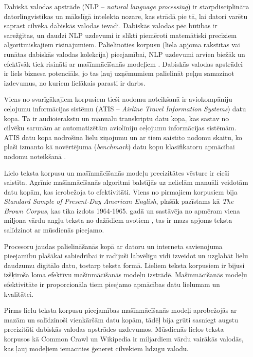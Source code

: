 Dabiskā valodas apstrāde (NLP -- \textit{natural language processing}) ir starpdisciplināra datorlingvistikas un mākslīgā intelekta nozare, kas strādā pie tā, lai datori varētu saprast cilvēka dabiskās valodas ievadi. Dabiskās valodas pēc būtības ir sarežģītas, un daudzi NLP uzdevumi ir slikti piemēroti matemātiski precīziem algoritmiskajiem risinājumiem. Palielinoties korpusu (liela apjoma rakstītas vai runātas dabiskās valodas kolekcija) pieejamībai, NLP uzdevumi arvien biežāk un efektīvāk tiek risināti ar mašīnmācīšanās modeļiem \cite{nlp2018}. Dabiskās valodas apstrādei ir liels biznesa potenciāls, jo tas ļauj uzņēmumiem palielināt peļņu samazinot izdevumus, no kuriem lielākais parasti ir darbs. %


Viens no svarīgākajiem korpusiem tieši nodomu noteikšanā ir aviokompāniju ceļojumu informācijas sistēmu (ATIS -- \textit{Airline Travel Information Systems}) datu kopa. Tā ir audioierakstu un manuālu transkriptu datu kopa, kas sastāv no cilvēku sarunām ar automatizētām aviolīniju ceļojumu informācijas sistēmām. ATIS datu kopa nodrošina lielu ziņojumu un ar tiem saistīto nodomu skaitu, ko plaši izmanto kā novērtējuma (\textit{benchmark}) datu kopu klasifikatoru apmācībai nodomu noteikšanā \cite{atis1990}.

Lielo teksta korpusu un mašīnmācīšanās modeļu precizitātes vēsture ir cieši saistīta. Agrīnie mašīnmācīšanās algoritmi balstījās uz nelielām manuāli veidotām datu kopām, kas ierobežoja to efektivitāti. Viens no pirmajiem korpusiem bija \textit{Standard Sample of Present-Day American English}, plašāk pazīstams kā \textit{The Brown Corpus}, kas tika izdots 1964-1965. gadā un sastāvēja no apmēram viena miljona vārdu angļu teksta no dažādiem avotiem \cite{brown-corpus}, tas ir mazs apjoms teksta salīdzinot ar mūsdienās pieejamo.

Procesoru jaudas palielināšanās kopā ar datoru un interneta savienojuma pieejamību plašākai sabiedrībai ir radījuši labvēlīgu vidi izveidot un uzglabāt lielu daudzumu digitālo datu, tostarp teksta formā. Lieliem teksta korpusiem ir bijusi izšķiroša loma efektīvu mašīnmācīšanās modeļu izstrādē. Mašīnmācīšanās modeļu efektivitāte ir proporcionāla tiem pieejamo apmācības datu lielumam un kvalitātei. %

Pirms lielu teksta korpusu pieejamības mašīnmācīšanās modeļi aprobežojās ar mazām un salīdzinoši vienkāršām datu kopām, tādēļ bija grūti sasniegt augstu precizitāti dabiskās valodas apstrādes uzdevumos. Mūsdienās lielos teksta korpusos kā Common Crawl un Wikipedia ir miljardiem vārdu vairākās valodās, kas ļauj modeļiem iemācīties ģenerēt cilvēkiem līdzīgu valodu.




